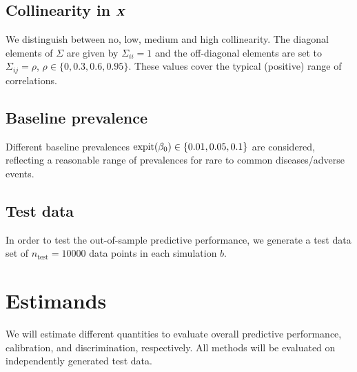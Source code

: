 \documentclass[a4paper, 11pt]{article}\usepackage[]{graphicx}\usepackage[]{color}
\begin{document}

\subsection*{Collinearity in $\text{\boldmath$X$}$}
We distinguish between no, low, medium and high collinearity. The diagonal
elements of $\Sigma$ are given by $\Sigma_{ii} = 1$ and the off-diagonal
elements are set to $\Sigma_{ij} = \rho$, $\rho \in \{0, 0.3, 0.6, 0.95\}$.
These values cover the typical (positive) range of correlations.

\subsection*{Baseline prevalence}
Different baseline prevalences $\operatorname{expit}(\beta_0) \in \{0.01, 0.05, 0.1\}$ are 
considered, reflecting a reasonable range of prevalences for rare to
common diseases/adverse events.

\subsection*{Test data}
In order to test the out-of-sample predictive performance, we generate a test data set of
$n_{\text{test}} = 10000$ data points in each simulation $b$.

\section{Estimands} \label{sec:estimands}
We will estimate different quantities to evaluate overall predictive performance,
calibration, and discrimination, respectively. All methods will be evaluated on
independently generated test data.
\end{document}
